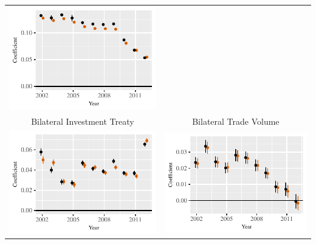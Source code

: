 \documentclass[reqno,onecolumn,letterpaper,12pt]{article}
\begin{document}
\begin{longtable}{c@{\hskip -.4cm}c}
\includegraphics[height=.2\textheight, clip=true, trim=.5cm .5cm 0cm .1cm]{draft_figures/rl_plots/GDPpc_out.pdf}   \\
Bilateral Investment Treaty &
Bilateral Trade Volume\\
\includegraphics[height=.2\textheight, clip=true, trim=0cm .5cm 0cm .1cm]{draft_figures/rl_plots/BIT.pdf}    &
\includegraphics[height=.2\textheight, clip=true, trim=.5cm .5cm 0cm .1cm]{draft_figures/rl_plots/TradeV.pdf}   \\

\end{longtable}
\end{document}
